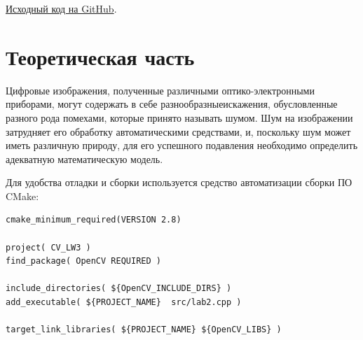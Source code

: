 





\href{https://github.com/mfclabber/itmo-cv-labs/tree/main/lab3}{Исходный код на GitHub}. 

\section{Теоретическая часть}

Цифровые изображения, полученные различными оптико-электронными приборами, 
могут содержать в себе разнообразныеискажения, обусловленные разного рода помехами, 
которые принято называть шумом. Шум на изображении затрудняет его обработку
автоматическими средствами, и, поскольку шум может иметь различную природу, 
для его успешного подавления необходимо определить адекватную математическую модель.

Для удобства отладки и сборки используется средство автоматизации сборки ПО CMake:
\begin{lstlisting}[style=cpp_white, caption={CMakeLists.txt для сборки проекта}]
cmake_minimum_required(VERSION 2.8)

project( CV_LW3 )
find_package( OpenCV REQUIRED )

include_directories( ${OpenCV_INCLUDE_DIRS} )
add_executable( ${PROJECT_NAME}  src/lab2.cpp )

target_link_libraries( ${PROJECT_NAME} ${OpenCV_LIBS} )
\end{lstlisting}

\pagebreak

